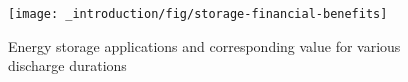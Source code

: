 \begin{figure}\centering
	\texttt{[image: \_introduction/fig/storage-financial-benefits]}
	\caption{Energy storage applications and corresponding value for various discharge durations \cite{Deloitte2016}}
	\label{ch-introduction:fig:storage-financial-benefits}
\end{figure}
